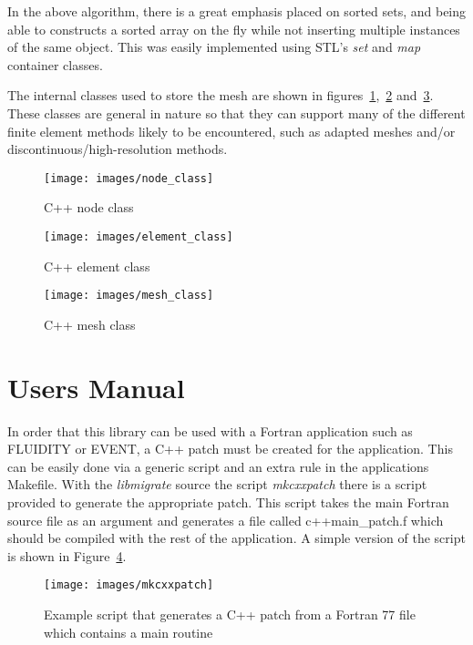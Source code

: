 \documentclass[11pt]{article}
\begin{document}
In the above algorithm, there is a great emphasis placed on sorted
sets, and being able to constructs a sorted array on the fly while
not inserting multiple instances of the same object. This was easily
implemented using STL's {\it set} and {\it map} container classes.

The internal classes used to store the mesh are shown in
figures~\ref{fig:node_class},~\ref{fig:element_class}
and~\ref{fig:mesh_class}. These classes are general in nature so that
they can support many of the different finite element methods likely
to be encountered, such as adapted meshes and/or
discontinuous/high-resolution methods.

\begin{figure}[h]\label{fig:node_class}
\centering
\texttt{[image: images/node\_class]}
\caption{C++ node class}
\end{figure}

\begin{figure}[h]\label{fig:element_class}
\centering
\texttt{[image: images/element\_class]}
\caption{C++ element class}
\end{figure}

\begin{figure}[h]\label{fig:mesh_class}
\centering
\texttt{[image: images/mesh\_class]}
\caption{C++ mesh class}
\end{figure}

\section{Users Manual}

In order that this library can be used with a Fortran application such
as FLUIDITY or EVENT, a C++ patch must be created for the application.
This can be easily done via a generic script and an extra rule in the
applications Makefile. With the {\it libmigrate} source the script
{\it mkcxxpatch} there is a script
provided to generate the appropriate patch. This script
takes the main Fortran source file as an argument and generates a file
called c++main\_patch.f which should be compiled with the rest of the
application. A simple version of the script is shown in Figure~\ref{fig:mkcxxpatch}.
\begin{figure}[h]\label{fig:mkcxxpatch}
\centering
\texttt{[image: images/mkcxxpatch]}
\caption{Example script that generates a C++ patch from a Fortran 77
file which contains a main routine}
\end{figure}
\end{document}
